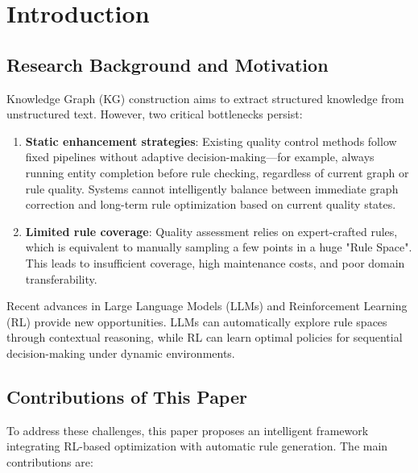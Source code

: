 \documentclass[runningheads]{llncs}
\begin{document}
\section{Introduction}

\subsection{Research Background and Motivation}
Knowledge Graph (KG) construction aims to extract structured knowledge from unstructured text. However, two critical bottlenecks persist:

\begin{enumerate}
    \item \textbf{Static enhancement strategies}: Existing quality control methods follow fixed pipelines without adaptive decision-making—for example, always running entity completion before rule checking, regardless of current graph or rule quality. Systems cannot intelligently balance between immediate graph correction and long-term rule optimization based on current quality states.
    \item \textbf{Limited rule coverage}: Quality assessment relies on expert-crafted rules, which is equivalent to manually sampling a few points in a huge "Rule Space". This leads to insufficient coverage, high maintenance costs, and poor domain transferability.
\end{enumerate}

Recent advances in Large Language Models (LLMs) and Reinforcement Learning (RL) provide new opportunities. LLMs can automatically explore rule spaces through contextual reasoning, while RL can learn optimal policies for sequential decision-making under dynamic environments.

\subsection{Contributions of This Paper}
To address these challenges, this paper proposes an intelligent framework integrating RL-based optimization with automatic rule generation. The main contributions are:
\end{document}
